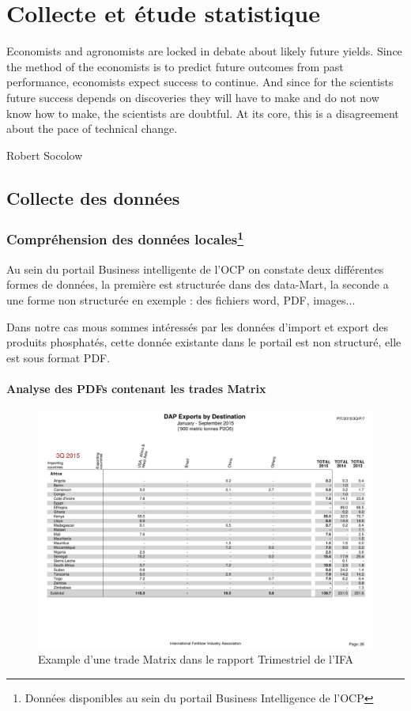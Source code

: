 \chapter{Collecte et étude statistique}
\epigraph{Economists and agronomists are locked in debate about likely
future yields. Since the method of the economists is to predict
future outcomes from past performance, economists expect
success to continue. And since for the scientists future success
depends on discoveries they will have to make and do not now
know how to make, the scientists are doubtful. At its core, this is
a disagreement about the pace of technical change.}{Robert
Socolow}	
\cleardoublepage
\newcommand{\reels}{\mathbb{R}}
	\section{Collecte des données}
	\subsection{Compréhension des données locales\protect\footnote{Données disponibles au sein du portail Business Intelligence de l'OCP}}
	Au sein du portail Business intelligente de l'OCP on constate deux différentes formes de données, la première est structurée dans des data-Mart, la seconde a une forme non structurée en exemple : des fichiers word, PDF, images...
	\par
	Dans notre cas mous sommes intéressés par les données d'import et export des produits phosphatés, cette donnée existante dans le portail est non structuré, elle est sous format PDF.
	\subsubsection{Analyse des PDFs contenant les trades Matrix}
	\begin{figure}[h]
	    		\centering
    			\includegraphics[scale=0.6]{IFA_EX}
	    		\caption{Example d'une trade Matrix dans le rapport Trimestriel de l'IFA}
	    		\label{fig:IFA}
	\end{figure}
